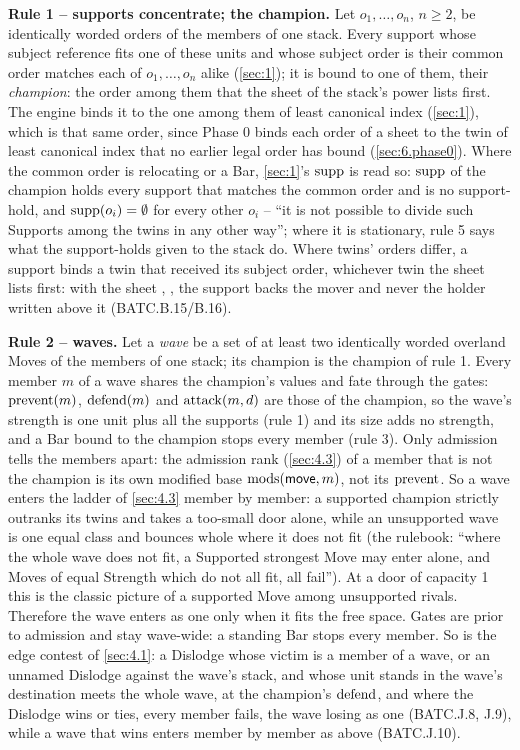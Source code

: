 \documentclass[12pt,a4paper]{article}
\begin{document}
\textbf{Rule 1 -- supports concentrate; the champion.}
Let $o_1, \dots, o_n$, $n \ge 2$, be identically worded orders of the members of one stack.
Every support whose subject reference fits one of these units and whose subject order is their common order matches each of $o_1, \dots, o_n$ alike (\cref{sec:1}); it is bound to one of them, their \emph{champion}: the order among them that the sheet of the stack's power lists first.
The engine binds it to the one among them of least canonical index (\cref{sec:1}), which is that same order, since Phase 0 binds each order of a sheet to the twin of least canonical index that no earlier legal order has bound (\cref{sec:6.phase0}).
Where the common order is relocating or a Bar, \cref{sec:1}'s $\operatorname{supp}$ is read so: $\operatorname{supp}$ of the champion holds every support that matches the common order and is no support-hold, and $\operatorname{supp}(o_i) = \emptyset$ for every other $o_i$ -- ``it is not possible to divide such Supports among the twins in any other way''; where it is stationary, rule 5 says what the support-holds given to the stack do.
Where twins' orders differ, a support binds a twin that received its subject order, whichever twin the sheet lists first: with the sheet , ,  the support backs the mover and never the holder written above it (BATC.B.15/B.16).

\textbf{Rule 2 -- waves.}
Let a \emph{wave} be a set of at least two identically worded overland Moves of the members of one stack; its champion is the champion of rule 1.
Every member $m$ of a wave shares the champion's values and fate through the gates: $\operatorname{prevent}(m)$, $\operatorname{defend}(m)$ and $\operatorname{attack}(m, d)$ are those of the champion, so the wave's strength is one unit plus all the supports (rule 1) and its size adds no strength, and a Bar bound to the champion stops every member (rule 3).
Only admission tells the members apart: the admission rank (\cref{sec:4.3}) of a member that is not the champion is its own modified base $\operatorname{mods}(\mathsf{move}, m)$, not its $\operatorname{prevent}$.
So a wave enters the ladder of \cref{sec:4.3} member by member: a supported champion strictly outranks its twins and takes a too-small door alone, while an unsupported wave is one equal class and bounces whole where it does not fit (the rulebook: ``where the whole wave does not fit, a Supported strongest Move may enter alone, and Moves of equal Strength which do not all fit, all fail'').
At a door of capacity 1 this is the classic picture of a supported Move among unsupported rivals.
Therefore the wave enters as one only when it fits the free space.
Gates are prior to admission and stay wave-wide: a standing Bar stops every member.
So is the edge contest of \cref{sec:4.1}: a Dislodge whose victim is a member of a wave, or an unnamed Dislodge against the wave's stack, and whose unit stands in the wave's destination meets the whole wave, at the champion's $\operatorname{defend}$, and where the Dislodge wins or ties, every member fails, the wave losing as one (BATC.J.8, J.9), while a wave that wins enters member by member as above (BATC.J.10).
\end{document}
